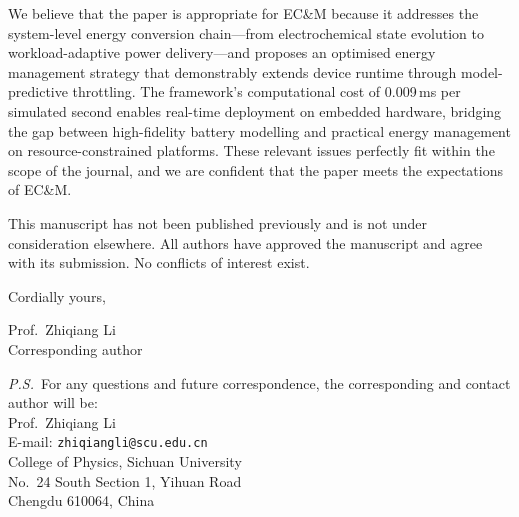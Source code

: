 \documentclass[12pt]{article}
\begin{document}
We believe that the paper is appropriate for EC\&M because it addresses the system-level energy conversion chain---from electrochemical state evolution to workload-adaptive power delivery---and proposes an optimised energy management strategy that demonstrably extends device runtime through model-predictive throttling.
The framework's computational cost of 0.009\,ms per simulated second enables real-time deployment on embedded hardware, bridging the gap between high-fidelity battery modelling and practical energy management on resource-constrained platforms.
These relevant issues perfectly fit within the scope of the journal, and we are confident that the paper meets the expectations of EC\&M.

This manuscript has not been published previously and is not under consideration elsewhere.
All authors have approved the manuscript and agree with its submission.
No conflicts of interest exist.

\bigskip
\noindent Cordially yours,

\medskip
\noindent Prof.\ Zhiqiang Li\\
Corresponding author

\bigskip
\noindent\textit{P.S.}\ For any questions and future correspondence, the corresponding and contact author will be:\\
Prof.\ Zhiqiang Li\\
E-mail: \texttt{zhiqiangli@scu.edu.cn}\\
College of Physics, Sichuan University\\
No.\ 24 South Section 1, Yihuan Road\\
Chengdu 610064, China
\end{document}
